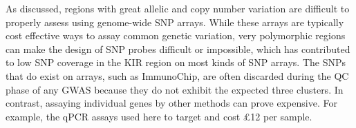 



As discussed, regions with great allelic and copy number variation are difficult to properly assess using genome-wide SNP arrays.
While these arrays are typically cost effective ways to assay common genetic variation, very polymorphic regions can make the design of SNP probes
difficult or impossible, which has contributed to low SNP coverage in the KIR region on most kinds of SNP arrays.
The SNPs that do exist on arrays, such as ImmunoChip, are often discarded during the QC phase of any GWAS because they do not exhibit the expected three clusters.
In contrast, assaying individual genes by other methods can prove expensive.
For example, the qPCR assays used here to target  and  cost \pounds12 per sample.


